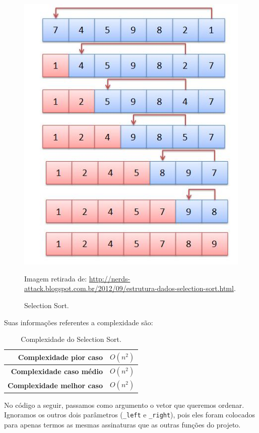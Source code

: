 \begin{figure}[!htb]
	\centering
	\includegraphics{img/selection-sort.jpg}
	\caption{Selection Sort.}
	\small{Imagem retirada de: \url{http://nerds-attack.blogspot.com.br/2012/09/estrutura-dados-selection-sort.html}.}
	\label{selection-sort}
\end{figure}

Suas informações referentes a complexidade são:

\begin{table}[H]
 \centering
	\begin{tabular}{| r | l |}
		\hline
		\textbf{Complexidade pior caso}   & $O(n^{2})$ \\
		\hline
		\textbf{Complexidade caso médio}  & $O(n^{2})$ \\
		\hline
		\textbf{Complexidade melhor caso} & $O(n^{2})$ \\
		\hline
	\end{tabular}
	\caption{Complexidade do Selection Sort.}
	\label{t_selection_sort}
\end{table}

No código a seguir, passamos como argumento o vetor que queremos ordenar. Ignoramos os outros dois parâmetros (\texttt{\_left} e \texttt{\_right}), pois eles foram colocados para apenas termos as mesmas assinaturas que as outras funções do projeto.


